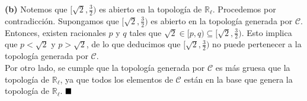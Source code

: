 \documentclass{article}
\begin{document}
\textbf{(b) } Notemos que $[\sqrt{2}, \frac{3}{2})$ es abierto en la topología de $\mathbb{R}_{\ell}$. Procedemos por contradicción. Supongamos que $[\sqrt{2}, \frac{3}{2})$ es abierto en la topología generada por $\mathcal{C}$. Entonces, existen racionales $p$ y $q$ tales que $\sqrt{2} \in [p, q) \subseteq [\sqrt{2}, \frac{3}{2})$. Esto implica que $p < \sqrt{2}$ y $p > \sqrt{2}$, de lo que deducimos que $[\sqrt{2}, \frac{3}{2})$ no puede pertenecer a la topología generada por $\mathcal{C}$. \\
Por otro lado, se cumple que la topología generada por $\mathcal{C}$ es más gruesa que la topología de $\mathbb{R}_{\ell}$, ya que todos los elementos de $\mathcal{C}$ están en la base que genera la topología de $\mathbb{R}_{\ell}$. $\hspace*{\fill} \blacksquare$\\
\end{document}
